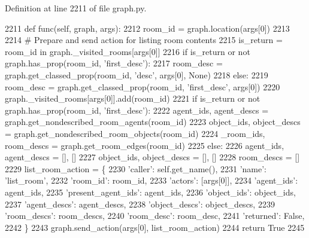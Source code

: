 Definition at line 2211 of file graph.\+py.


\begin{DoxyCode}
2211     \textcolor{keyword}{def }func(self, graph, args):
2212         room\_id = graph.location(args[0])
2213 
2214         \textcolor{comment}{# Prepare and send action for listing room contents}
2215         is\_return = room\_id \textcolor{keywordflow}{in} graph.\_visited\_rooms[args[0]]
2216         \textcolor{keywordflow}{if} is\_return \textcolor{keywordflow}{or} \textcolor{keywordflow}{not} graph.has\_prop(room\_id, \textcolor{stringliteral}{'first\_desc'}):
2217             room\_desc = graph.get\_classed\_prop(room\_id, \textcolor{stringliteral}{'desc'}, args[0], \textcolor{keywordtype}{None})
2218         \textcolor{keywordflow}{else}:
2219             room\_desc = graph.get\_classed\_prop(room\_id, \textcolor{stringliteral}{'first\_desc'}, args[0])
2220         graph.\_visited\_rooms[args[0]].add(room\_id)
2221         \textcolor{keywordflow}{if} is\_return \textcolor{keywordflow}{or} \textcolor{keywordflow}{not} graph.has\_prop(room\_id, \textcolor{stringliteral}{'first\_desc'}):
2222             agent\_ids, agent\_descs = graph.get\_nondescribed\_room\_agents(room\_id)
2223             object\_ids, object\_descs = graph.get\_nondescribed\_room\_objects(room\_id)
2224             \_room\_ids, room\_descs = graph.get\_room\_edges(room\_id)
2225         \textcolor{keywordflow}{else}:
2226             agent\_ids, agent\_descs = [], []
2227             object\_ids, object\_descs = [], []
2228             room\_descs = []
2229         list\_room\_action = \{
2230             \textcolor{stringliteral}{'caller'}: self.get\_name(),
2231             \textcolor{stringliteral}{'name'}: \textcolor{stringliteral}{'list\_room'},
2232             \textcolor{stringliteral}{'room\_id'}: room\_id,
2233             \textcolor{stringliteral}{'actors'}: [args[0]],
2234             \textcolor{stringliteral}{'agent\_ids'}: agent\_ids,
2235             \textcolor{stringliteral}{'present\_agent\_ids'}: agent\_ids,
2236             \textcolor{stringliteral}{'object\_ids'}: object\_ids,
2237             \textcolor{stringliteral}{'agent\_descs'}: agent\_descs,
2238             \textcolor{stringliteral}{'object\_descs'}: object\_descs,
2239             \textcolor{stringliteral}{'room\_descs'}: room\_descs,
2240             \textcolor{stringliteral}{'room\_desc'}: room\_desc,
2241             \textcolor{stringliteral}{'returned'}: \textcolor{keyword}{False},
2242         \}
2243         graph.send\_action(args[0], list\_room\_action)
2244         \textcolor{keywordflow}{return} \textcolor{keyword}{True}
2245 
\end{DoxyCode}



